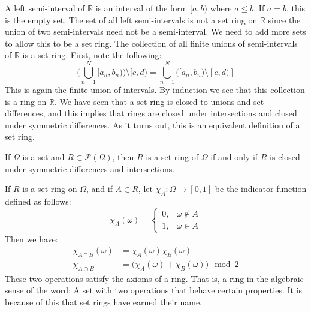 \documentclass[crop=false,class=book,oneside]{standalone}
\begin{document}
            A left semi-interval of $\mathbb{R}$ is an interval
            of the form $[a,b)$ where $a\leq{b}$. If $a=b$, this
            is the empty set. The set of all left semi-intervals
            is not a set ring on $\mathbb{R}$ since the union
            of two semi-intervals need not be a semi-interval.
            We need to add more sets to allow this to be a
            set ring. The collection of all finite unions of
            semi-intervals of $\mathbb{R}$ is a set ring.
            First, note the following:
            \begin{equation}
                \Big(\bigcup_{n=1}^{N}[a_{n},b_{n})\Big)
                \setminus[c,d)=\bigcup_{n=1}^{N}
                \Big([a_{n},b_{n})\setminus[c,d)]
            \end{equation}
            This is again the finite union of intervals. By
            induction we see that this collection is a ring on
            $\mathbb{R}$. We have seen that a set ring is
            closed to unions and set differences, and this
            implies that rings are closed under intersections and
            closed under symmetric differences. As it turns out,
            this is an equivalent definition of a set ring.
            \begin{theorem}
                If $\Omega$ is a set and
                $R\subset\mathcal{P}(\Omega)$, then $R$ is
                a set ring of $\Omega$ if and only if $R$ is
                closed under symmetric differences and
                intersections.
            \end{theorem}
            If $R$ is a set ring on $\Omega$, and if
            $A\in{R}$, let $\chi_{A}:\Omega\rightarrow[0,1]$ be
            the indicator function defined as follows:
            \begin{equation}
                \chi_{A}(\omega)=
                \begin{cases}
                    0,&\omega\notin{A}\\
                    1,&\omega\in{A}
                \end{cases}
            \end{equation}
            Then we have:
            \begin{align}
                \chi_{A\cap{B}}(\omega)
                &=\chi_{A}(\omega)\chi_{B}(\omega)\\
                \chi_{A\ominus{B}}&=
                \big(\chi_{A}(\omega)+\chi_{B}(\omega)\big)
                \mod{2}
            \end{align}
            These two operations satisfy the axioms of a ring.
            That is, a ring in the algebraic sense of the word:
            A set with two operations that behave certain
            properties. It is because of this that set rings
            have earned their name.
\end{document}
